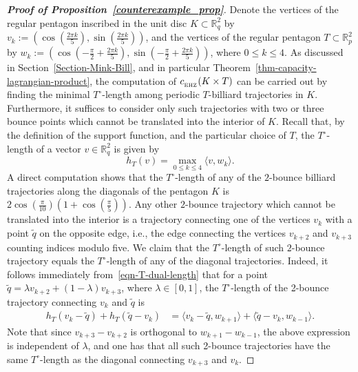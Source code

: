 \documentclass[10pt,a4paper]{article}
\theoremstyle{definition}
\newcommand{\R}{{\mathbb{R}}}
\newcommand{\ehzcap}{c_{_{\rm EHZ}}}
\begin{document}
\begin{proof}[{\bf Proof of Proposition~\ref{counterexample_prop}}]
  
Denote the vertices of the regular pentagon inscribed in the unit disc $K \subset \R^2_q$ by $v_k := (\cos(\frac{2\pi k}{5}), \sin(\frac{2\pi k}{5}))$, and the vertices of the regular pentagon $T \subset \R^2_p$ by  $w_k:= (\cos(-\frac{\pi}{2} + \frac{2\pi k}{5}), \sin(-\frac{\pi}{2} + \frac{2\pi k}{5}))$, where $0 \leq k \leq 4$. 
As discussed in Section~\ref{Section-Mink-Bill}, and in particular Theorem~\ref{thm-capacity-lagrangian-product}, the computation of $\ehzcap(K \times T)$ can be carried out by finding the minimal $T^{\circ}$-length among periodic $T$-billiard trajectories in $K$. Furthermore, it suffices to consider only such trajectories with two or three bounce points which cannot be translated into the interior of $K$.
Recall that, by the definition of the support function, and the particular choice of $T$, the $T^\circ$-length of a vector $v \in \R^2_q$ is given by
\begin{equation} \label{eqn-T-dual-length} 
h_T(v) = \max_{0\leq k \leq 4} \langle v, w_k \rangle. 
\end{equation}
A direct computation shows that the $T^{\circ}$-length of any  of the $2$-bounce billiard trajectories along the diagonals of the pentagon $K$ is
$ 2 \cos(\frac{\pi}{10}) (1 + \cos(\frac{\pi}{5}))$. 
Any other $2$-bounce trajectory which cannot be translated into the interior is a trajectory connecting one of the vertices $v_k$ with a point 
$\widetilde q$ on the opposite edge, i.e., the edge connecting the vertices $v_{k+2}$ and $v_{k+3}$ counting indices modulo five.
We claim that the $T^\circ$-length of such $2$-bounce trajectory equals the $T^\circ$-length of any of the diagonal trajectories.
Indeed, it follows immediately from~\eqref{eqn-T-dual-length} that for a point $\widetilde q = \lambda v_{k+2} + (1 - \lambda)v_{k+3}$, where $\lambda \in [0,1]$, the $T^{\circ}$-length of the 2-bounce trajectory connecting $v_k$ and $\widetilde q$ is  
\begin{align*}
    h_T(v_k-\widetilde q)+h_T(\widetilde q - v_k) &= \langle v_k - \widetilde q, w_{k+1} \rangle + \langle \widetilde q - v_k, w_{k-1} \rangle.
\end{align*}
Note that since $ v_{k+3} - v_{k+2}$ is orthogonal to $w_{k+1} - w_{k-1}$, 
the above expression is independent of $\lambda$,
and one has that all such 2-bounce trajectories have the same $T^{\circ}$-length as the diagonal connecting $v_{k+3}$ and $v_k$.     



\end{proof}
\end{document}
